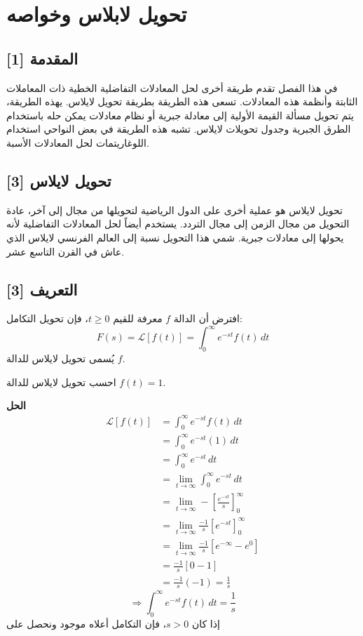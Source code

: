 \chapter{تحويل لابلاس وخواصه}

\section*{المقدمة [1]}
في هذا الفصل تقدم طريقة أخرى لحل المعادلات التفاضلية الخطية ذات المعاملات الثابتة وأنظمة هذه المعادلات. تسعى هذه الطريقة بطريقة تحويل لايلاس. يهذه الطريقة، يتم تحويل مسألة القيمة الأولية إلى معادلة جبرية أو نظام معادلات يمكن حله باستخدام الطرق الجبرية وجدول تحويلات لايلاس. تشبه هذه الطريقة في بعض النواحي استخدام اللوغاريتمات لحل المعادلات الأسبة.

\section{ تحويل لايلاس [3]}
تحويل لايلاس هو عملية أخرى على الدول الرياضية لتحويلها من مجال إلى آخر، عادة التحويل من مجال الزمن إلى مجال التردد. يستخدم أيضاً لحل المعادلات التفاضلية لأنه يحولها إلى معادلات جبرية. شمي هذا التحويل نسبة إلى العالم الفرنسي لايلاس الذي عاش في القرن التاسع عشر.

\section{التعريف [3]}
افترض أن الدالة \( f \) معرفة للقيم \( t \geq 0 \)، فإن تحويل التكامل:
\begin{equation}
	F(s) = \mathcal{L}[f(t)] = \int_{0}^{\infty} e^{-st}f(t) \, dt
\end{equation}
يُسمى تحويل لايلاس للدالة \( f \).

\begin{example}
احسب تحويل لايلاس للدالة \( f(t) = 1 \).
\end{example}
\noindent
\textbf{الحل}
\begin{align*}
\mathcal{L}[f(t)] &= \int_{0}^{\infty} e^{-st}f(t) \, dt
\\
&= \int_{0}^{\infty} e^{-st}(1) \, dt
\\
&= \int_{0}^{\infty} e^{-st} \, dt
\\
&= \lim_{t \to \infty} \int_0^\infty e^{-st} \, dt
\\
&= \lim_{t \to \infty} - \left[ \frac{e^{-st}}{s} \right]_0^\infty
\\
&= \lim_{t \to \infty} \frac{-1}{s} \left[ e^{-st} \right]_0^\infty
\\
&= \lim_{t \to \infty} \frac{-1}{s} \left[ e^{-\infty} - e^0 \right]
\\
&= \frac{-1}{s} \left[ 0 - 1 \right]
\\
&= \frac{-1}{s} (-1) = \frac{1}{s}
\end{align*}
\[
\Rightarrow\int_0^\infty e^{-st} f(t) \, dt = \frac{1}{s}
\]
\noindent
إذا كان \( s > 0 \)، فإن التكامل أعلاه موجود ونحصل على
